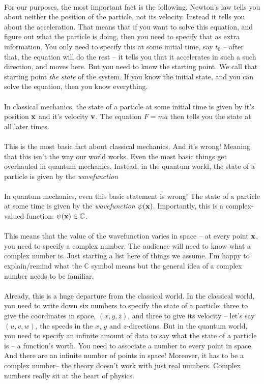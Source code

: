 \documentclass[12pt]{article}
\newcommand\para{\paragraph{}}
\newcommand{\bx}{{\bf x}}
\begin{document}
\para
For our purposes, the most important fact is the following. Newton's law tells you about neither the position of the particle, not its velocity. Instead it tells you about the acceleration. That means that if you want to solve this equation, and figure out what the particle is doing, then you need to specify that as extra information. You only need to specify this at some initial time, say $t_0$ -- after that, the equation will do the rest -- it tells you that it accelerates in such a such direction, and moves here. But you need to know the starting point. We call that starting point {\it the state} of the system. If you know the initial state, and you can solve the equation, then you know everything.

\para
{\color{olive}In classical mechanics, the state of a particle at some initial time is given by it's position ${\bf x}$ and it's velocity ${\bf v}$. The equation $F=ma$ then tells you the state at all later times.}

\para
This is the most basic fact about classical mechanics. And it's wrong! Meaning that this isn't the way our world works. Even the most basic things get overhauled in quantum mechanics. Instead, in the quantum world, the state of a particle is given by the {\it wavefunction}

\para
{\color{olive} In quantum mechanics, even this basic statement is wrong! The state of a particle at some time is given by the {\it wavefunction} $\psi(\bx)$. Importantly, this is a complex-valued function: $\psi(\bx) \in \mathbb{C}$.}  

\para
This means that the value of the wavefunction varies in space -- at every point $\bx$, you need to specify a complex number.  {\color{blue} The audience will need to know what a complex number is. Just starting a list here of things we assume. I'm happy to explain/remind what the $\mathbb{C}$ symbol means but the general idea of a complex number needs to be familiar.} 

\para
Already, this is a huge departure from the classical world. In the classical world, you need to write down six numbers to specify the state of a particle: three to give the coordinates in space, $(x,y,z)$, and three to give its velocity  -- let's say $(u,v,w)$, the speeds in the $x$, $y$ and $z$-directions. But in the quantum world, you need to specify an infinite amount of data to say what the state of a particle is -- a function's worth. You need to associate a number to every point in space. And there are an infinite number of points in space! Moreover, it has to be a complex number-- the theory doesn't work with just real numbers. Complex numbers really sit at the heart of physics. 
\end{document}
